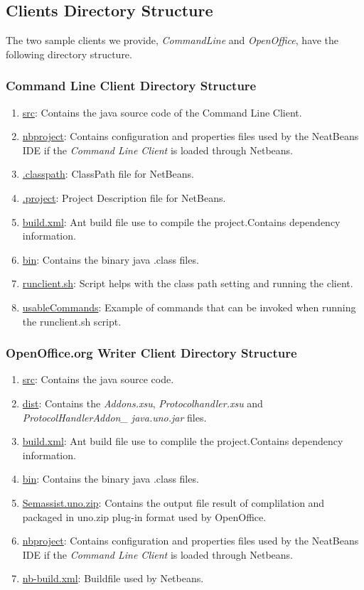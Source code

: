 \subsection{Clients Directory Structure}
The two sample clients we provide, \emph{CommandLine} and \emph{OpenOffice}, have the following directory structure.

\subsubsection{Command Line Client Directory Structure}
\begin{enumerate}
\item \url{src}: Contains the java source code of the Command Line Client.
\item \url{nbproject}: Contains configuration and properties files used by the NeatBeans IDE if the \emph{Command Line Client} is loaded through Netbeans.
\item \url{.classpath}: ClassPath file for NetBeans.
\item \url{.project}: Project Description file for NetBeans.
\item \url{build.xml}: Ant build file use to compile the project.Contains dependency information.
\item \url{bin}: Contains the binary java .class files.
\item \url{runclient.sh}: Script helps with the class path setting and running the client.
\item \url{usableCommands}: Example of commands that can be invoked when running the runclient.sh script.
\end{enumerate}

\subsubsection{OpenOffice.org Writer Client Directory Structure}
\begin{enumerate}
\item \url{src}: Contains the java source code.
\item \url{dist}: Contains the \emph{Addons.xsu}, \emph{Protocolhandler.xsu} and \emph{ProtocolHandlerAddon\_ java.uno.jar} files.
\item \url{build.xml}: Ant build file use to complile the project.Contains dependency information.
\item \url{bin}: Contains the binary java .class files.
\item \url{Semassist.uno.zip}: Contains the output file result of complilation and packaged in uno.zip plug-in format used by OpenOffice.
\item \url{nbproject}: Contains configuration and properties files used by the NeatBeans IDE if the \emph{Command Line Client} is loaded through Netbeans.
\item \url{nb-build.xml}: Buildfile used by Netbeans.
\end{enumerate}

